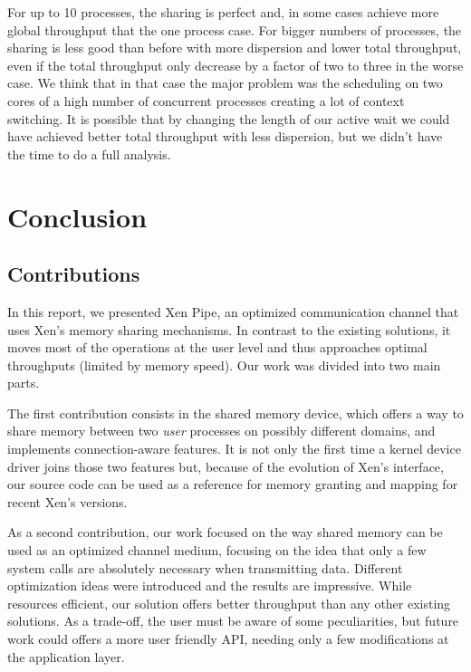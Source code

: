 \documentclass[journal]{IEEEtran}
\begin{document}


For up to 10 processes, the sharing is perfect and, in some cases achieve more global throughput that the one process case. For bigger numbers of processes, the sharing is less good than before with more dispersion and lower total throughput, even if the total throughput only decrease by a factor of two to three in the worse case. We think that in that case the major problem was the scheduling on two cores of a high number of concurrent processes creating a lot of context switching. It is possible that by changing the length of our active wait we could have achieved better total throughput with less dispersion, but we didn't have the time to do a full analysis.

\section{Conclusion}

\subsection{Contributions}

In this report, we presented Xen Pipe, an optimized communication channel that uses Xen's memory sharing mechanisms. In contrast to the existing solutions, it moves most of the operations at the user level and thus approaches optimal throughputs (limited by memory speed). Our work was divided into two main parts.

The first contribution consists in the shared memory device, which offers a way to share memory between two \emph{user} processes on possibly different domains, and implements connection-aware features. It is not only the first time a kernel device driver joins those two features but, because of the evolution of Xen's interface, our source code can be used as a reference for memory granting and mapping for recent Xen's versions.

As a second contribution, our work focused on the way shared memory can be used as an optimized channel medium, focusing on the idea that only a few system calls are absolutely necessary when transmitting data. Different optimization ideas were introduced and the results are impressive. While resources efficient, our solution offers better throughput than any other existing solutions. As a trade-off, the user must be aware of some peculiarities, but future work could offers a more user friendly API, needing only a few modifications at the application layer.
\end{document}
